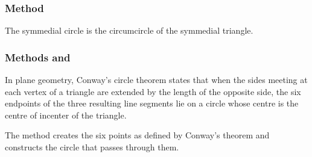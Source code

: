 \vspace{1em}

\begin{tkzexample}[latex=8cm]
\end{tkzexample}

\subsubsection{Method }
\label{ssub:method_triangle_symmedial_circ}
The symmedial circle is the circumcircle of the symmedial triangle.

\begin{tkzexample}[latex=8cm]
\end{tkzexample}


\subsubsection{Methods  and } %
\label{ssub:method_triangle_conway}

In plane geometry, Conway's circle theorem states that when the sides meeting at each vertex of a triangle are extended by the length of the opposite side, the six endpoints of the three resulting line segments lie on a circle whose centre is the centre of incenter of the triangle.

The method  creates the six points as defined by Conway’s theorem and constructs the circle that passes through them.

